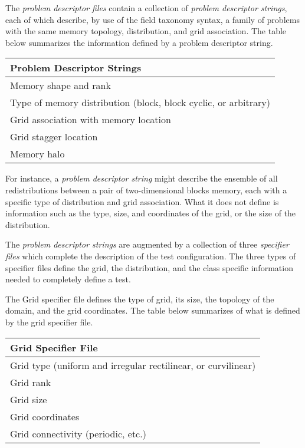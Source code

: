 The \textit{problem descriptor files} contain a collection of \textit{problem descriptor strings}, each of which describe, by use of the field taxonomy syntax, a family of problems with the same memory topology, distribution, and grid association. The table below summarizes the information defined by a problem descriptor string.  
\begin{center}
\begin{tabular}{|l|} \hline
Problem Descriptor Strings \\
\hline \hline
Memory shape and rank \\
Type of memory distribution (block, block cyclic, or arbitrary) \\
Grid association with memory location \\
Grid stagger location \\
Memory halo \\
\hline
\end{tabular}
\end{center}
For instance, a \textit{problem descriptor string} might describe the ensemble of all redistributions between a pair of two-dimensional blocks memory, each with a specific type of distribution and grid association. What it does not define is information such as the type, size, and coordinates of the grid, or the size of the distribution.

The \textit{problem descriptor strings} are augmented by a collection of three \textit{specifier files} which complete the description of the test configuration. The three types of specifier files define the grid, the distribution, and the class specific information needed to completely define a test.

The Grid specifier file defines the type of grid, its size, the topology of the domain, and the grid coordinates. The table below summarizes of what is defined by the grid specifier file.  
\begin{center}
\begin{tabular}{|l|} \hline
Grid Specifier File \\
\hline \hline
Grid type (uniform and irregular rectilinear, or curvilinear) \\
Grid rank \\
Grid size \\
Grid coordinates \\
Grid connectivity (periodic, etc.) \\
\hline
\end{tabular}
\end{center}

